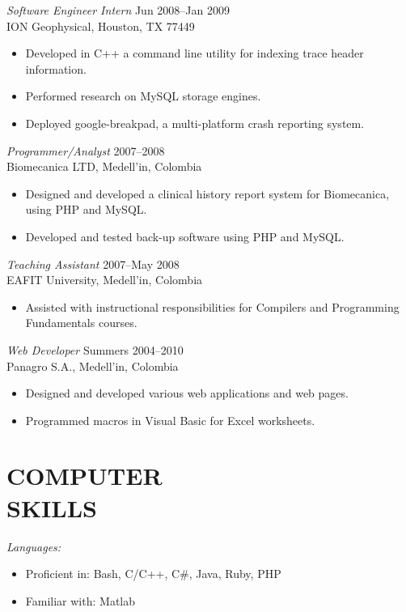 \documentclass[line,margin]{res}
\begin{document}
\begin{resume}
{\sl Software Engineer Intern} \hfill Jun 2008--Jan 2009\\
ION Geophysical, Houston, TX 77449
\begin{itemize} \itemsep -2pt
    \item Developed in C++ a command line utility for indexing trace header information.
    \item Performed research on MySQL storage engines.
    \item Deployed google-breakpad, a multi-platform crash reporting system.
\end{itemize}

{\sl Programmer/Analyst} \hfill 2007--2008\\
Biomecanica LTD, Medell\a'in, Colombia
\begin{itemize} \itemsep -2pt
    \item Designed and developed a clinical history report system for Biomecanica, using PHP and MySQL.
    \item Developed and tested back-up software using PHP and MySQL.
\end{itemize}

{\sl Teaching Assistant} \hfill 2007--May 2008\\
EAFIT University, Medell\a'in, Colombia
\begin{itemize} \itemsep -2pt
    \item  Assisted with instructional responsibilities for Compilers and Programming Fundamentals courses.
\end{itemize}

{\sl Web Developer} \hfill Summers  2004--2010\\
Panagro S.A., Medell\a'in, Colombia
\begin{itemize} \itemsep -2pt
    \item Designed and developed various web applications and web pages.  
    \item Programmed macros in Visual Basic for Excel worksheets.
\end{itemize}

 
\section{COMPUTER \\ SKILLS} %
\label{sec:computer_skills}
    {\sl Languages:}
    \begin{itemize} \itemsep -2pt
        \item Proficient in: Bash, C/C++, C\#, Java, Ruby, PHP 
        \item Familiar with: Matlab
    \end{itemize}


\end{resume}
\end{document}

